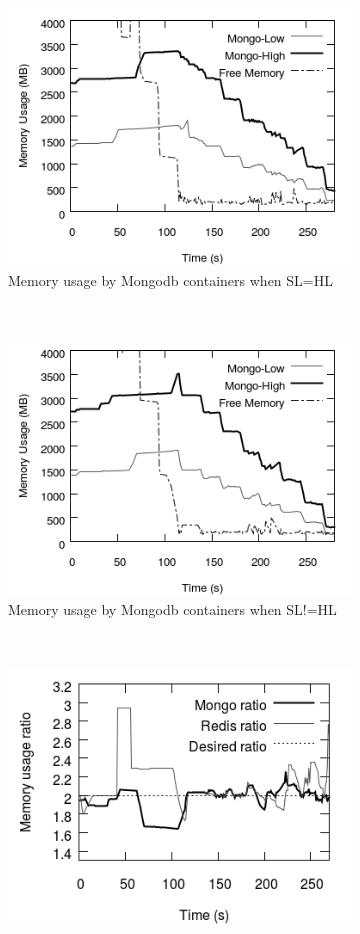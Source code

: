 \begin{figure}
	\begin{subfigure}{0.30\textwidth}
	  \includegraphics[scale=0.4]{images/mem_sol/sl=hl_mtp/memory_usage.png}
	  \caption{\footnotesize Memory usage by Mongodb containers when SL=HL}
	  \label{mem_sol_sl=hl_mongo}
	\end{subfigure}
	~
	\begin{subfigure}{0.30\textwidth}
	  \includegraphics[scale=0.4]{images/mem_sol/sl!=hl_mtp/memory_usage.png}
	  \caption{\footnotesize Memory usage by Mongodb containers when SL!=HL}
	  \label{mem_sol_sl!=hl_mongo}
	\end{subfigure}	
	~
	\begin{subfigure}{0.30\textwidth}
	  \includegraphics[scale=0.4]{images/mem_sol/memory_ratio_base.png}

\end{subfigure}
\end{figure}
